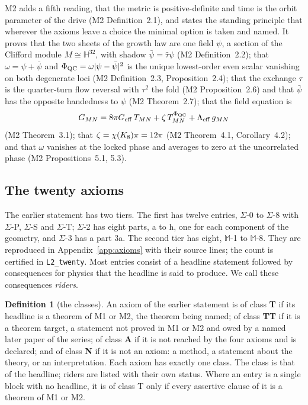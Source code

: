 \documentclass[11pt,a4paper]{article}
\theoremstyle{plain}
\theoremstyle{definition}
\newtheorem{definition}[theorem]{Definition}
\theoremstyle{remark}
\newcommand{\Hquat}{\mathbb{H}}
\newcommand{\Max}[1]{$\mathbb{M}$-#1}
\newcommand{\Sig}[1]{$\Sigma$-#1}
\begin{document}
M2 adds a fifth reading, that the metric is positive-definite and time is the orbit parameter of the drive (M2 Definition~2.1), and states the standing principle that wherever the axioms leave a choice the minimal option is taken and named. It proves that the two sheets of the growth law are one field $\psi$, a section of the Clifford module $M\cong\Hquat^{32}$, with shadow $\bar\psi=\hat\tau\psi$ (M2 Definition~2.2); that $\omega=\psi+\bar\psi$ and $\Phi_{\mathrm{QC}}=\omega\lvert\psi-\bar\psi\rvert^{2}$ is the unique lowest-order even scalar vanishing on both degenerate loci (M2 Definition~2.3, Proposition~2.4); that the exchange $\tau$ is the quarter-turn flow reversal with $\tau^{2}$ the fold (M2 Proposition~2.6) and that $\bar\psi$ has the opposite handedness to $\psi$ (M2 Theorem~2.7); that the field equation is
\begin{equation}\label{eq:master}
G_{MN}=8\pi G_{\mathrm{eff}}\,T_{MN}+\zeta\,T^{\Phi_{\mathrm{QC}}}_{MN}+\Lambda_{\mathrm{eff}}\,g_{MN}
\end{equation}
(M2 Theorem~3.1); that $\zeta=\chi(K_8)\pi=12\pi$ (M2 Theorem~4.1, Corollary~4.2); and that $\omega$ vanishes at the locked phase and averages to zero at the uncorrelated phase (M2 Propositions~5.1, 5.3).

\subsection{The twenty axioms}\label{sec:twenty}

The earlier statement has two tiers. The first has twelve entries, \Sig{0} to \Sig{8} with \Sig{P}, \Sig{S} and \Sig{T}; \Sig{2} has eight parts, a to h, one for each component of the geometry, and \Sig{3} has a part 3a. The second tier has eight, \Max{1} to \Max{8}. They are reproduced in Appendix~\ref{app:axioms} with their source lines; the count is certified in \texttt{L2\_twenty}. Most entries consist of a headline statement followed by consequences for physics that the headline is said to produce. We call these consequences \emph{riders}.

\begin{definition}[the classes]\label{def:classes}
An axiom of the earlier statement is of class \textbf{T} if its headline is a theorem of M1 or M2, the theorem being named; of class \textbf{TT} if it is a theorem target, a statement not proved in M1 or M2 and owed by a named later paper of the series; of class \textbf{A} if it is not reached by the four axioms and is declared; and of class \textbf{N} if it is not an axiom: a method, a statement about the theory, or an interpretation. Each axiom has exactly one class. The class is that of the headline; riders are listed with their own status. Where an entry is a single block with no headline, it is of class T only if every assertive clause of it is a theorem of M1 or M2.
\end{definition}
\end{document}
